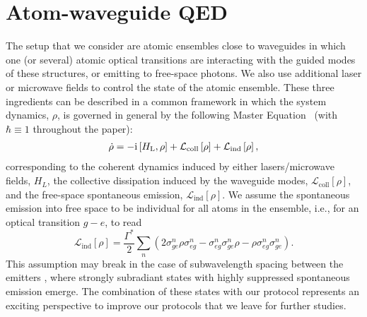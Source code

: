 \documentclass[twocolumn,pra,aps,superscriptaddress,showpacs]{revtex4-1}
\def\ii{\mathord{\rm i}}
\begin{document}
\section{Atom-waveguide QED}\label{sec:waveguide}

The setup that we consider are atomic ensembles close to waveguides in which one (or several) atomic optical transitions are interacting with the guided modes of these structures, or emitting to free-space photons. We also use additional laser or microwave fields to control the state of the atomic ensemble. These three ingredients can be described in a common framework in which the system dynamics, $\rho$, is governed in general by the following Master Equation~\cite{gardiner_book00a} (with $\hbar\equiv 1$ throughout the paper):
%
\begin{align}\label{eq:rho}
\dot \rho =
	- \ii \left[ H_\mathrm{L} , \rho \right]
	+ \mathcal{L}_\mathrm{coll} \left[ \rho \right]
	+ \mathcal{L}_\mathrm{ind} \left[ \rho \right],
\end{align}
%
corresponding to the coherent dynamics induced by either lasers/microwave fields, $H_L$, the collective dissipation induced by the waveguide modes, $\mathcal{L}_\mathrm{coll} \left[ \rho \right]$, and the free-space spontaneous emission, $\mathcal{L}_\mathrm{ind} \left[ \rho \right]$. We assume the spontaneous emission into free space to be individual for all atoms in the ensemble, i.e., for an optical transition $g-e$, to read
%
\begin{equation}\label{eq:lind}
\mathcal{L}_\mathrm{ind} \left[ \rho \right]
	= \frac{\Gamma^*}{2} \sum_n
	\left( 
	2 \sigma_{ge}^n \rho \sigma_{eg}^n - \sigma_{eg}^n \sigma_{ge}^n \rho - \rho \sigma_{eg}^n \sigma_{ge}^n
	\right).
\end{equation}
%
This assumption may break in the case of subwavelength spacing between the emitters \cite{asenjogarcia17a}, where strongly subradiant states with highly suppressed spontaneous emission emerge. The combination of these states with our protocol represents an exciting perspective to improve our protocols that we leave for further studies.
\end{document}
